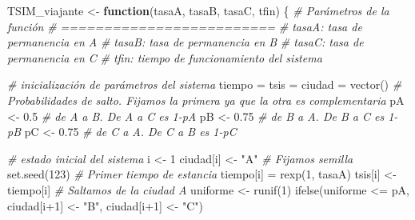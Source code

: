 \documentclass[
]{book}
\newenvironment{Shaded}{\begin{snugshade}}{\end{snugshade}}
\newcommand{\CommentTok}[1]{\textcolor[rgb]{0.56,0.35,0.01}{\textit{#1}}}
\newcommand{\ControlFlowTok}[1]{\textcolor[rgb]{0.13,0.29,0.53}{\textbf{#1}}}
\newcommand{\DecValTok}[1]{\textcolor[rgb]{0.00,0.00,0.81}{#1}}
\newcommand{\FloatTok}[1]{\textcolor[rgb]{0.00,0.00,0.81}{#1}}
\newcommand{\FunctionTok}[1]{\textcolor[rgb]{0.00,0.00,0.00}{#1}}
\newcommand{\NormalTok}[1]{#1}
\newcommand{\OtherTok}[1]{\textcolor[rgb]{0.56,0.35,0.01}{#1}}
\newcommand{\SpecialCharTok}[1]{\textcolor[rgb]{0.00,0.00,0.00}{#1}}
\newcommand{\StringTok}[1]{\textcolor[rgb]{0.31,0.60,0.02}{#1}}
\theoremstyle{definition}
\theoremstyle{definition}
\theoremstyle{definition}
\theoremstyle{definition}
\theoremstyle{remark}
\begin{document}
\begin{Shaded}
\begin{Highlighting}[]
\NormalTok{TSIM\_viajante }\OtherTok{\textless{}{-}} \ControlFlowTok{function}\NormalTok{(tasaA, tasaB, tasaC, tfin)}
\NormalTok{\{}
  \CommentTok{\# Parámetros de la función}
  \CommentTok{\# =========================}
  \CommentTok{\# tasaA: tasa de permanencia en A}
  \CommentTok{\# tasaB: tasa de permanencia en B}
  \CommentTok{\# tasaC: tasa de permanencia en C}
  \CommentTok{\# tfin: tiempo de funcionamiento del sistema}
  
  \CommentTok{\# inicialización de parámetros del sistema }
\NormalTok{  tiempo }\OtherTok{=}\NormalTok{ tsis }\OtherTok{=}\NormalTok{ ciudad }\OtherTok{=} \FunctionTok{vector}\NormalTok{()}
  \CommentTok{\# Probabilidades de salto. Fijamos la primera ya que la otra es complementaria}
\NormalTok{  pA }\OtherTok{\textless{}{-}} \FloatTok{0.5} \CommentTok{\# de A a B. De A a C es  1{-}pA}
\NormalTok{  pB }\OtherTok{\textless{}{-}} \FloatTok{0.75} \CommentTok{\# de B a A. De B a C es  1{-}pB}
\NormalTok{  pC }\OtherTok{\textless{}{-}} \FloatTok{0.75} \CommentTok{\# de C a A. De C a B es  1{-}pC}
  
  \CommentTok{\# estado inicial del sistema}
\NormalTok{  i }\OtherTok{\textless{}{-}} \DecValTok{1}
\NormalTok{  ciudad[i] }\OtherTok{\textless{}{-}} \StringTok{"A"}
  \CommentTok{\# Fijamos semilla}
  \FunctionTok{set.seed}\NormalTok{(}\DecValTok{123}\NormalTok{)}
  \CommentTok{\# Primer tiempo de estancia}
\NormalTok{  tiempo[i] }\OtherTok{=} \FunctionTok{rexp}\NormalTok{(}\DecValTok{1}\NormalTok{, tasaA)}
\NormalTok{  tsis[i] }\OtherTok{\textless{}{-}}\NormalTok{ tiempo[i]}
  \CommentTok{\# Saltamos de la ciudad A}
\NormalTok{  uniforme }\OtherTok{\textless{}{-}} \FunctionTok{runif}\NormalTok{(}\DecValTok{1}\NormalTok{)}
  \FunctionTok{ifelse}\NormalTok{(uniforme }\SpecialCharTok{\textless{}=}\NormalTok{ pA, ciudad[i}\SpecialCharTok{+}\DecValTok{1}\NormalTok{] }\OtherTok{\textless{}{-}} \StringTok{"B"}\NormalTok{, ciudad[i}\SpecialCharTok{+}\DecValTok{1}\NormalTok{] }\OtherTok{\textless{}{-}} \StringTok{"C"}\NormalTok{)}
      

\end{Highlighting}
\end{Shaded}
\end{document}
